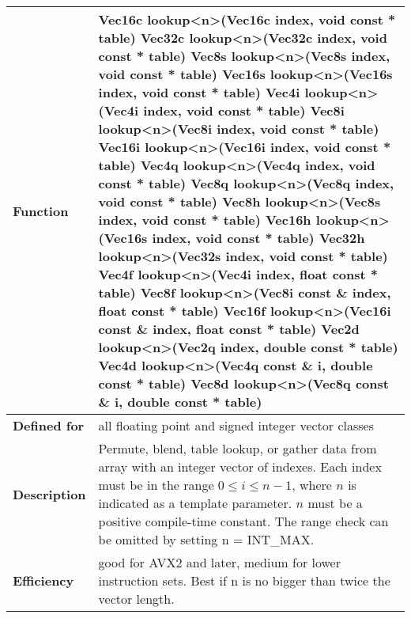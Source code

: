 \documentclass[vcl_manual.tex]{subfiles}
\begin{document}
\begin{tabular}{|p{30mm}|p{120mm}|}
\hline
\bfseries Function &
Vec16c lookup\textless n\textgreater(Vec16c index, void const * table) \newline
Vec32c lookup\textless n\textgreater(Vec32c index, void const * table) \newline
Vec8s lookup\textless n\textgreater(Vec8s index, void const * table) \newline
Vec16s lookup\textless n\textgreater(Vec16s index, void const * table) \newline
Vec4i lookup\textless n\textgreater(Vec4i index, void const * table) \newline
Vec8i lookup\textless n\textgreater(Vec8i index, void const * table) \newline
Vec16i lookup\textless n\textgreater(Vec16i index, void const * table) \newline
Vec4q lookup\textless n\textgreater(Vec4q index, void const * table) \newline
Vec8q lookup\textless n\textgreater(Vec8q index, void const * table) \newline
Vec8h lookup\textless n\textgreater(Vec8s index, void const * table) \newline
Vec16h lookup\textless n\textgreater(Vec16s index, void const * table) \newline
Vec32h lookup\textless n\textgreater(Vec32s index, void const * table) \newline
Vec4f lookup\textless n\textgreater(Vec4i index, float const * table) \newline
Vec8f lookup\textless n\textgreater(Vec8i const \& index, float const * table) \newline
Vec16f lookup\textless n\textgreater(Vec16i const \& index, float const * table) \newline
Vec2d lookup\textless n\textgreater(Vec2q index, double const * table) \newline
Vec4d lookup\textless n\textgreater(Vec4q const \& i, double const * table) \newline
Vec8d lookup\textless n\textgreater(Vec8q const \& i, double const * table) \\ \hline
\bfseries Defined for & all floating point and signed integer vector classes \\ \hline
\bfseries Description & Permute, blend, table lookup, or gather data from array with an integer vector of indexes.\newline
Each index must be in the range  $0 \leq i \leq n-1$, where $n$ is indicated as a template parameter. $n$ must be a positive compile-time constant. 
The range check can be omitted by setting n = INT\_MAX. \\ \hline
\bfseries Efficiency & good for AVX2 and later, medium for lower instruction sets.
Best if n is no bigger than twice the vector length. \\ \hline
\end{tabular}
\end{document}
